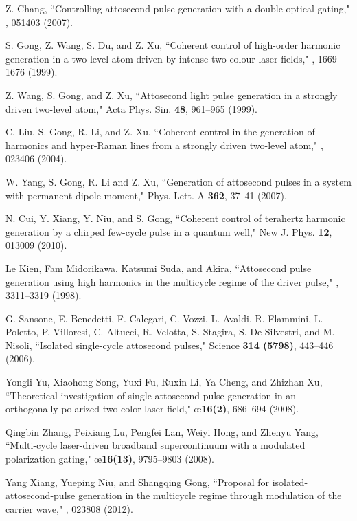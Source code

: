 \documentclass[10pt,letterpaper]{article}
\begin{document}
\begin{thebibliography}{99}
Z. Chang, ``Controlling attosecond pulse generation with a double optical gating," , 051403 (2007).

S. Gong, Z. Wang, S. Du, and Z. Xu, ``Coherent control of high-order harmonic generation in a two-level atom driven by intense two-colour laser fields," , 1669--1676 (1999).

Z. Wang, S. Gong, and Z. Xu, ``Attosecond light pulse generation in a strongly driven two-level atom," Acta Phys. Sin. {\bf 48}, 961--965 (1999).

C. Liu, S. Gong, R. Li, and Z. Xu, ``Coherent control in the generation of harmonics and hyper-Raman lines from a strongly driven two-level atom," , 023406 (2004).

W. Yang, S. Gong, R. Li and Z. Xu, ``Generation of attosecond pulses in a system with permanent dipole moment," Phys. Lett. A {\bf 362}, 37--41 (2007).

N. Cui, Y. Xiang, Y. Niu, and S. Gong, ``Coherent control of terahertz harmonic generation by a chirped few-cycle pulse in a quantum well," New J. Phys. {\bf 12}, 013009 (2010).

Le Kien, Fam Midorikawa, Katsumi Suda, and Akira, ``Attosecond pulse generation using high harmonics in the multicycle regime of the driver pulse," , 3311--3319 (1998).

G. Sansone, E. Benedetti, F. Calegari, C. Vozzi, L. Avaldi, R. Flammini, L. Poletto, P. Villoresi, C. Altucci, R. Velotta, S. Stagira, S. De Silvestri, and M. Nisoli, ``Isolated single-cycle attosecond pulses," Science {\bf 314 (5798)}, 443--446 (2006).

Yongli Yu, Xiaohong Song, Yuxi Fu, Ruxin Li, Ya Cheng, and Zhizhan Xu, ``Theoretical investigation of single attosecond pulse generation in an orthogonally polarized two-color laser field," \oe {\bf 16(2)}, 686--694 (2008).

Qingbin Zhang, Peixiang Lu, Pengfei Lan, Weiyi Hong, and Zhenyu Yang, ``Multi-cycle laser-driven broadband supercontinuum with a modulated polarization gating," \oe {\bf 16(13)}, 9795--9803 (2008).

Yang Xiang, Yueping Niu, and Shangqing Gong, ``Proposal for isolated-attosecond-pulse generation in the multicycle regime through modulation of the carrier wave," , 023808 (2012).


\end{thebibliography}
\end{document}
